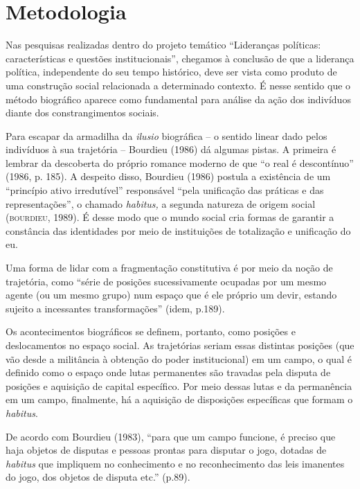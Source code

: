 \section{Metodologia}

Nas pesquisas realizadas dentro do projeto temático ``Lideranças
políticas: características e questões institucionais'', chegamos à
conclusão de que a liderança política, independente do seu tempo
histórico, deve ser vista como produto de uma construção social
relacionada a determinado contexto. É nesse sentido que o método
biográfico aparece como fundamental para análise da ação dos indivíduos
diante dos constrangimentos sociais.

Para escapar da armadilha da \emph{ilusio} biográfica -- o sentido
linear dado pelos indivíduos à sua trajetória -- Bourdieu (1986) dá
algumas pistas. A primeira é lembrar da descoberta do próprio romance
moderno de que ``o real é descontínuo'' (1986, p. 185). A despeito
disso, Bourdieu (1986) postula a existência de um ``princípio ativo
irredutível'' responsável ``pela unificação das práticas e das
representações'', o chamado \emph{habitus,} a segunda natureza de origem
social (\textsc{bourdieu}, 1989). É desse modo que o mundo social cria formas de
garantir a constância das identidades por meio de instituições de
totalização e unificação do eu.

Uma forma de lidar com a fragmentação constitutiva é por meio da noção
de trajetória, como ``série de posições sucessivamente ocupadas por um
mesmo agente (ou um mesmo grupo) num espaço que é ele próprio um devir,
estando sujeito a incessantes transformações'' (idem, p.189).

Os acontecimentos biográficos se definem, portanto, como posições e
deslocamentos no espaço social. As trajetórias seriam essas distintas
posições (que vão desde a militância à obtenção do poder institucional)
em um campo, o qual é definido como o espaço onde lutas permanentes são
travadas pela disputa de posições e aquisição de capital específico. Por
meio dessas lutas e da permanência em um campo, finalmente, há a
aquisição de disposições específicas que formam o \emph{habitus}.

De acordo com Bourdieu (1983), ``para que um campo funcione, é preciso
que haja objetos de disputas e pessoas prontas para disputar o jogo,
dotadas de \emph{habitus} que impliquem no conhecimento e no
reconhecimento das leis imanentes do jogo, dos objetos de disputa etc.''
(p.89).

